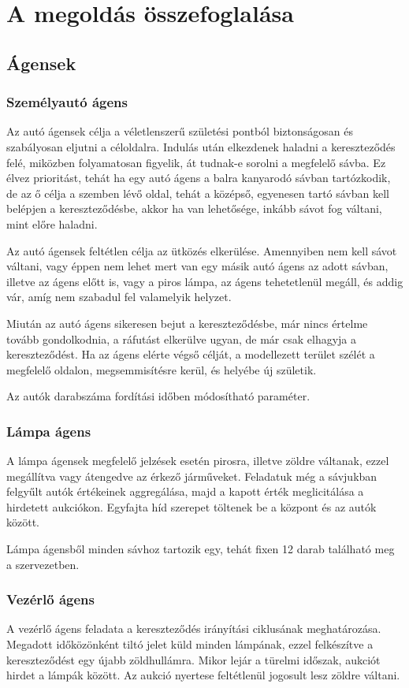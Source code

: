 \documentclass[a4paper, 11pt]{article}
\begin{document}
\section{A megoldás összefoglalása}
\subsection{Ágensek}
\subsubsection{Személyautó ágens}
Az autó ágensek célja a véletlenszerű születési pontból biztonságosan és szabályosan eljutni a céloldalra.
Indulás után elkezdenek haladni a kereszteződés felé, miközben folyamatosan figyelik, át tudnak-e sorolni
a megfelelő sávba. Ez élvez prioritást, tehát ha egy autó ágens a balra kanyarodó sávban tartózkodik, de
az ő célja a szemben lévő oldal, tehát a középső, egyenesen tartó sávban kell belépjen a kereszteződésbe, akkor
ha van lehetősége, inkább sávot fog váltani, mint előre haladni.

Az autó ágensek feltétlen célja az ütközés elkerülése. Amennyiben nem kell sávot váltani, vagy éppen nem
lehet mert van egy másik autó ágens az adott sávban, illetve az ágens előtt is, vagy a piros lámpa, az ágens
tehetetlenül megáll, és addig vár, amíg nem szabadul fel valamelyik helyzet.

Miután az autó ágens sikeresen
bejut a kereszteződésbe, már nincs értelme tovább gondolkodnia, a ráfutást elkerülve ugyan, de már csak
elhagyja a kereszteződést. Ha az ágens elérte végső célját, a modellezett terület szélét a megfelelő oldalon,
megsemmisítésre kerül, és helyébe új születik.

Az autók darabszáma fordítási időben módosítható paraméter.
	
\subsubsection{Lámpa ágens}
A lámpa ágensek megfelelő jelzések esetén pirosra, illetve zöldre váltanak, ezzel megállítva vagy átengedve az érkező járműveket.
Feladatuk még a sávjukban felgyűlt autók értékeinek aggregálása, majd a kapott érték meglicitálása a
hirdetett aukciókon. Egyfajta híd szerepet töltenek be a központ és az autók között.

Lámpa ágensből minden sávhoz tartozik egy, tehát fixen 12 darab található meg a szervezetben.
\subsubsection{Vezérlő ágens}
A vezérlő ágens feladata a kereszteződés irányítási ciklusának meghatározása. Megadott időközönként
tiltó jelet küld minden lámpának, ezzel felkészítve a kereszteződést egy újabb zöldhullámra.
Mikor lejár a türelmi időszak, aukciót hirdet a lámpák között. Az aukció nyertese feltétlenül jogosult
lesz zöldre váltani.
\end{document}
